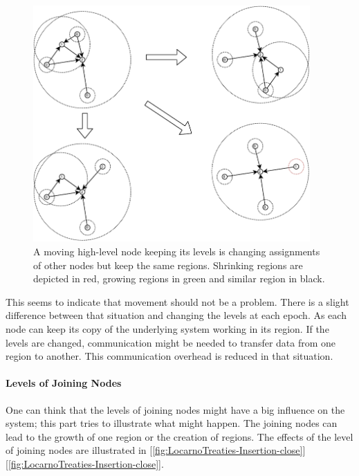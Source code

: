 \documentclass[a4paper,11pt,twoside,openright]{report}
\begin{document}
\begin{figure}[!h] 
\centering
\includegraphics[width=300pt]{figures/LocarnoTreaties-Moving}
\caption{A moving high-level node keeping its levels is changing assignments of other
 nodes but keep the same regions. Shrinking regions are depicted in red,
 growing regions in green and similar region in black. }
\label{fig:LocarnoTreaties-Moving}
\end{figure}

This seems to indicate that movement should not be a problem. There is a
slight difference between that situation and changing the levels at each
epoch. As each node can keep its copy of the underlying system working in its
region. If the levels are changed, communication might be needed to transfer
data from one region to another. This communication overhead is reduced in
that situation. 

\paragraph{Levels of Joining Nodes}
One can think that the levels of joining nodes might have a big influence on the
system; this part tries to illustrate what might happen. The joining nodes can
lead to the growth of one region or the creation
of regions. The effects of the level of joining nodes are illustrated in
[\autoref{fig:LocarnoTreaties-Insertion-close}][\autoref{fig:LocarnoTreaties-Insertion-close}].
\end{document}

